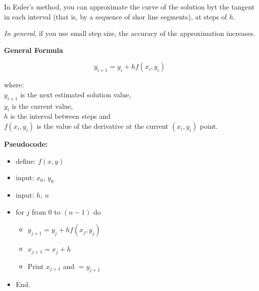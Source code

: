 \documentclass[10pt,b5paper,titlepage]{book}
\begin{document}
In Euler's method, you can approximate the curve of the solution byt the tangent
in each interval (that is, by a sequence of shor line segments), at steps of $ h $.

\textit{In general}, if you use small step size, the accuracy of the approximation
increases.

\textbf{General Formula}

\begin{equation}
    y_{i+1} = y_i + h f(x_i,y_i)
\end{equation}

where:\\
$ y_{i+1} $ is the next estimated solution value,\\
$ y_i $ is the current value,\\
$ h $ is the interval between steps and\\
$ f(x_i,y_i) $ is the value of the derivative at the current $ (x_i,y_i) $ point.

\textbf{Pseudocode:}

\begin{itemize}
    \item define: $ f(x,y) $

    \item input: $ x_0 $, $ y_0 $

    \item input: $ h $, $ n $

    \item for $ j $ from $ 0 $ to $ (n-1) $ do
        \begin{itemize}
            \item $ y_{j+1} = y_j + hf(x_j, y_j) $
            \item $ x_{j+1} = x_j + h $
            \item Print $ x_{j+1} $ and $= y_{j+1} $
        \end{itemize}
    \item End.
\end{itemize}
\end{document}
